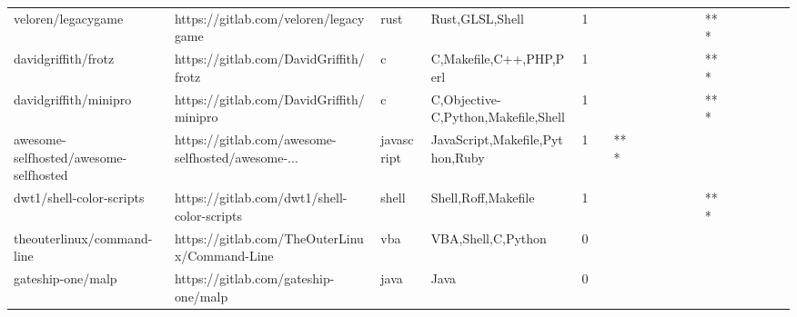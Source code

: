 \begin{tabular}{llllrlllllllllllll}
veloren/legacygame                                 &              https://gitlab.com/veloren/legacygame &              rust &                                    Rust,GLSL,Shell &       1 &         &        &           &                &                 &        &           &       *** &          &          &       &              &          \\
davidgriffith/frotz                                &             https://gitlab.com/DavidGriffith/frotz &                 c &                            C,Makefile,C++,PHP,Perl &       1 &         &        &           &                &                 &        &           &       *** &          &          &       &              &          \\
davidgriffith/minipro                              &           https://gitlab.com/DavidGriffith/minipro &                 c &                C,Objective-C,Python,Makefile,Shell &       1 &         &        &           &                &                 &        &           &       *** &          &          &       &              &          \\
awesome-selfhosted/awesome-selfhosted              &  https://gitlab.com/awesome-selfhosted/awesome-... &        javascript &                    JavaScript,Makefile,Python,Ruby &       1 &         &    *** &           &                &                 &        &           &           &          &          &       &              &          \\
dwt1/shell-color-scripts                           &        https://gitlab.com/dwt1/shell-color-scripts &             shell &                                Shell,Roff,Makefile &       1 &         &        &           &                &                 &        &           &       *** &          &          &       &              &          \\
theouterlinux/command-line                         &      https://gitlab.com/TheOuterLinux/Command-Line &               vba &                                 VBA,Shell,C,Python &       0 &         &        &           &                &                 &        &           &           &          &          &       &              &          \\
gateship-one/malp                                  &               https://gitlab.com/gateship-one/malp &              java &                                               Java &       0 &         &        &           &                &                 &        &           &           &          &          &       &              &          \\

\end{tabular}
